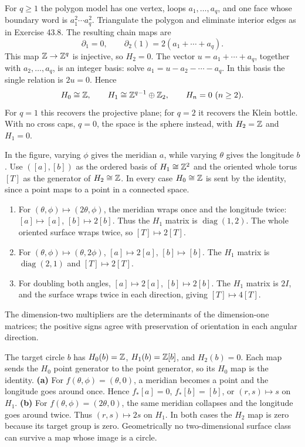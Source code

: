 For $q\ge1$ the polygon model has one vertex, loops $a_1,\ldots,a_q$, and one face whose boundary word is $a_1^2\cdots a_q^2$. Triangulate the polygon and eliminate interior edges as in Exercise 43.8. The resulting chain maps are
\[
\partial_1=0,\qquad \partial_2(1)=2(a_1+\cdots+a_q).
\]
This map $\mathbb{Z}\to\mathbb{Z}^q$ is injective, so $H_2=0$.
The vector $u=a_1+\cdots+a_q$, together with $a_2,\ldots,a_q$, is an integer basis: solve $a_1=u-a_2-\cdots-a_q$. In this basis the single relation is $2u=0$. Hence
\[
H_0\cong\mathbb{Z},\qquad H_1\cong\mathbb{Z}^{q-1}\oplus\mathbb{Z}_2,
\qquad H_n=0\ (n\ge2).
\]
For $q=1$ this recovers the projective plane; for $q=2$ it recovers the Klein bottle. With no cross caps, $q=0$, the space is the sphere instead, with $H_2=\mathbb{Z}$ and $H_1=0$.

In the figure, varying $\phi$ gives the meridian $a$, while varying $\theta$ gives the longitude $b$. Use $([a],[b])$ as the ordered basis of $H_1\cong\mathbb{Z}^2$ and the oriented whole torus $[T]$ as the generator of $H_2\cong\mathbb{Z}$. In every case $H_0\cong\mathbb{Z}$ is sent by the identity, since a point maps to a point in a connected space.
\begin{enumerate}[label=\textbf{(\alph*)}]
\item For $(\theta,\phi)\mapsto(2\theta,\phi)$, the meridian wraps once and the longitude twice: $[a]\mapsto[a]$, $[b]\mapsto2[b]$. Thus the $H_1$ matrix is $\operatorname{diag}(1,2)$. The whole oriented surface wraps twice, so $[T]\mapsto2[T]$.
\item For $(\theta,\phi)\mapsto(\theta,2\phi)$, $[a]\mapsto2[a]$, $[b]\mapsto[b]$. The $H_1$ matrix is $\operatorname{diag}(2,1)$ and $[T]\mapsto2[T]$.
\item For doubling both angles, $[a]\mapsto2[a]$, $[b]\mapsto2[b]$. The $H_1$ matrix is $2I$, and the surface wraps twice in each direction, giving $[T]\mapsto4[T]$.
\end{enumerate}
The dimension-two multipliers are the determinants of the dimension-one matrices; the positive signs agree with preservation of orientation in each angular direction.

The target circle $b$ has $H_0(b)=\mathbb{Z}$, $H_1(b)=\mathbb{Z}[b]$, and $H_2(b)=0$. Each map sends the $H_0$ point generator to the point generator, so its $H_0$ map is the identity.
\textbf{(a)} For $f(\theta,\phi)=(\theta,0)$, a meridian becomes a point and the longitude goes around once. Hence $f_*[a]=0$, $f_*[b]=[b]$, or $(r,s)\mapsto s$ on $H_1$.
\textbf{(b)} For $f(\theta,\phi)=(2\theta,0)$, the same meridian collapses and the longitude goes around twice. Thus $(r,s)\mapsto2s$ on $H_1$.
In both cases the $H_2$ map is zero because its target group is zero. Geometrically no two-dimensional surface class can survive a map whose image is a circle.

